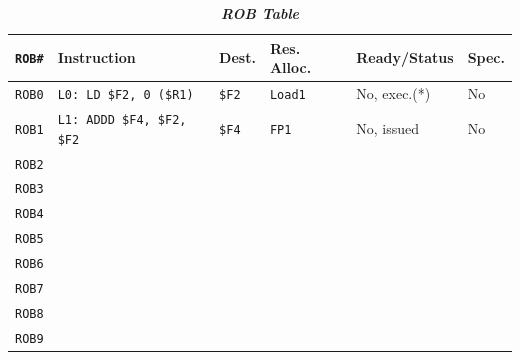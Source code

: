 \begin{table}[!htp]
    \centering
    \begin{adjustbox}{width={\textwidth},totalheight={\textheight},keepaspectratio}
        \begin{tabular}{@{} l l l l l l @{}}
            \toprule
            \texttt{ROB\#}  & \textbf{Instruction} & \textbf{Dest.} & \textbf{Res. Alloc.} & \textbf{Ready/Status} & \textbf{Spec.} \\
            \midrule
            \texttt{ROB0}   & \texttt{L0: LD \$F2, 0 (\$R1)}    & \texttt{\$F2} & \texttt{Load1}    & No, exec.(*)  & No    \\ [.3em]
            \texttt{ROB1}   & \texttt{L1: ADDD \$F4, \$F2, \$F2}& \texttt{\$F4} & \texttt{FP1}      & No, issued    & No    \\ [.3em]
            \texttt{ROB2}   &                                   &               &                   &               &       \\ [.3em]
            \texttt{ROB3}   &                                   &               &                   &               &       \\ [.3em]
            \texttt{ROB4}   &                                   &               &                   &               &       \\ [.3em]
            \texttt{ROB5}   &                                   &               &                   &               &       \\ [.3em]
            \texttt{ROB6}   &                                   &               &                   &               &       \\ [.3em]
            \texttt{ROB7}   &                                   &               &                   &               &       \\ [.3em]
            \texttt{ROB8}   &                                   &               &                   &               &       \\ [.3em]
            \texttt{ROB9}   &                                   &               &                   &               &       \\
            \bottomrule
        \end{tabular}
    \end{adjustbox}
    \caption*{\emph{\textbf{ROB Table}}}
\end{table}

\newpage

